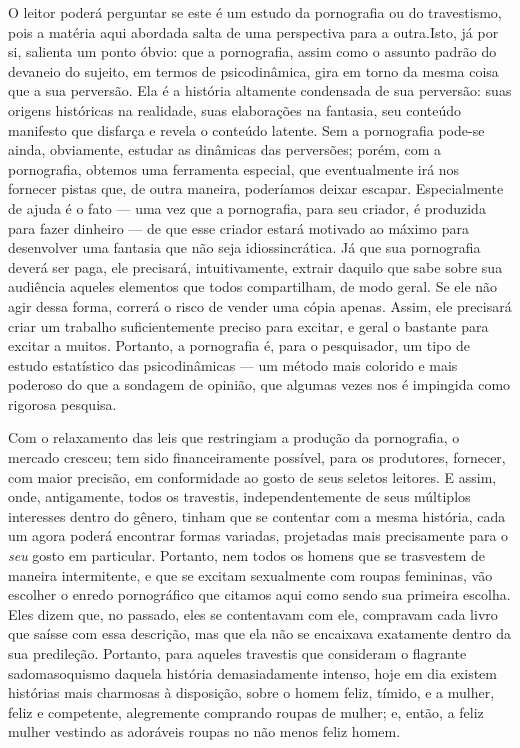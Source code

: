 O leitor poderá perguntar se este é um estudo da pornografia ou do
travestismo,\idxpornoinst{} pois a matéria aqui abordada salta de uma perspectiva para
a outra.\idxpornoplat[|(] Isto, já por si, salienta um ponto óbvio: que a pornografia,
assim como o assunto padrão do devaneio do sujeito, em termos de
psicodinâmica, gira em torno da mesma coisa que a sua perversão. Ela é
a história altamente condensada de sua perversão: suas origens
históricas na realidade, suas elaborações na fantasia, seu conteúdo
manifesto que disfarça e revela o conteúdo latente. Sem a pornografia
pode-se ainda, obviamente, estudar as dinâmicas das perversões; porém,
com a pornografia, obtemos uma ferramenta especial, que eventualmente
irá nos fornecer pistas que, de outra maneira, poderíamos deixar
escapar. Especialmente de ajuda é o fato --- uma vez que a
pornografia, para seu criador, é produzida para fazer dinheiro --- de
que esse criador estará motivado ao máximo para desenvolver uma
fantasia que não seja idiossincrática. Já que sua pornografia deverá
ser paga, ele precisará, intuitivamente, extrair daquilo que sabe sobre
sua audiência aqueles elementos que todos compartilham, de modo geral.
Se ele não agir dessa forma, correrá o risco de vender uma cópia
apenas. Assim, ele precisará criar um trabalho suficientemente preciso
para excitar, e geral o bastante para excitar a muitos. Portanto, a
pornografia é, para o pesquisador, um tipo de estudo estatístico das
psicodinâmicas --- um método mais colorido e mais poderoso do que a
sondagem de opinião, que algumas vezes nos é impingida como rigorosa
pesquisa.

Com o relaxamento das leis que restringiam a produção da
pornografia, o mercado cresceu; tem sido financeiramente possível, para
os produtores, fornecer, com maior precisão, em conformidade ao gosto
de seus seletos leitores. E assim, onde, antigamente, todos os
travestis, independentemente de seus múltiplos interesses dentro do
gênero, tinham que se contentar com a mesma história, cada um agora
poderá encontrar formas variadas, projetadas mais precisamente para o
\textit{seu} gosto em particular. Portanto, nem todos os homens que se
trasvestem de maneira intermitente, e que se excitam sexualmente com
roupas femininas, vão escolher o enredo pornográfico que citamos aqui
como sendo sua primeira escolha. Eles dizem que, no passado, eles se
contentavam com ele, compravam cada livro que saísse com essa
descrição, mas que ela não se encaixava exatamente dentro da sua
predileção. Portanto, para aqueles travestis que consideram o flagrante
sadomasoquismo\idxpornosadi{} daquela história\idxsadiporn{} demasiadamente intenso, hoje em dia
existem histórias mais charmosas à disposição, sobre o homem feliz,
tímido, e a mulher, feliz e competente, alegremente comprando roupas de
mulher; e, então, a feliz mulher vestindo as adoráveis roupas no não
menos feliz homem.

